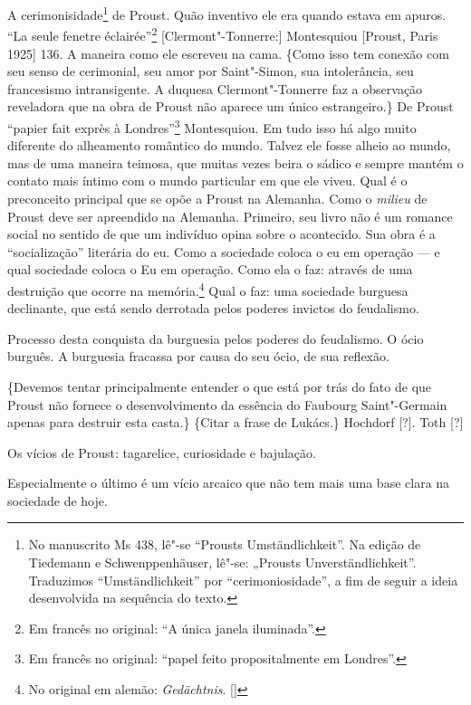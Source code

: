 A cerimonisidade\footnote{No manuscrito Ms 438, lê"-se ``Prousts
  Umständlichkeit''. Na edição de Tiedemann e Schwenppenhäuser, lê"-se:
  „Prousts Unverständlichkeit”. Traduzimos ``Umständlichkeit'' por
  ``cerimoniosidade'', a fim de seguir a ideia desenvolvida na sequência
  do texto. \versal{[N. T.]}} de Proust. Quão inventivo ele era quando estava em apuros.
``La seule fenetre éclairée''\footnote{Em francês no original: ``A
  única janela iluminada''. \versal{[N. T.]}} {[}Clermont"-Tonnerre:{]} Montesquiou
{[}Proust, Paris 1925{]} 136. A maneira como ele escreveu na cama.
\{Como isso tem conexão com seu senso de cerimonial, seu amor por
Saint"-Simon, sua intolerância, seu francesismo intransigente. A duquesa
Clermont"-Tonnerre faz a observação reveladora que na obra de Proust não
aparece um único estrangeiro.\} De Proust ``papier fait exprès à
Londres''\footnote{Em francês no original: ``papel feito %
  propositalmente em Londres''. \versal{[N. T.]}} Montesquiou. Em tudo isso há algo muito
diferente do alheamento romântico do mundo. Talvez ele fosse alheio ao
mundo, mas de uma maneira teimosa, que muitas vezes beira o sádico e
sempre mantém o contato mais íntimo com o mundo particular em que ele
viveu. Qual é o preconceito principal que se opõe a Proust na Alemanha.
Como o \emph{milieu} de Proust deve ser apreendido na Alemanha.
Primeiro, seu livro não é um romance social no sentido de que um
indivíduo opina sobre o acontecido. Sua obra é a ``socialização''
literária do eu. Como a sociedade coloca o eu em operação --- e qual
sociedade coloca o Eu em operação. Como ela o faz: através de uma
destruição que ocorre na memória.\footnote{No original em alemão: \emph{Gedächtnis}. []} Qual o faz: uma
sociedade burguesa declinante, que está sendo derrotada pelos poderes
invictos do feudalismo.

Processo desta conquista da burguesia pelos poderes do feudalismo. O
ócio burguês. A burguesia fracassa por causa do seu ócio, de sua
reflexão.

\{Devemos tentar principalmente entender o que está por trás do
fato de que Proust não fornece o desenvolvimento da essência do Faubourg
Saint"-Germain apenas para destruir esta casta.\} \{Citar a frase de
Lukács.\} Hochdorf {[}?{]}. Toth {[}?{]}

Os vícios de Proust: tagarelice, curiosidade e bajulação.

Especialmente o último é um vício arcaico que não tem mais uma base
clara na sociedade de hoje.

